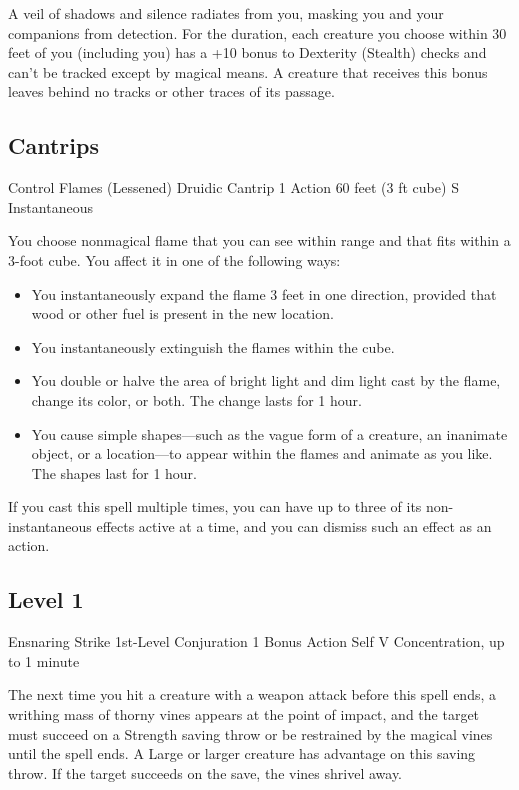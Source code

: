 \documentclass[letterpaper,openany,oneside,twocolumn]{book}
\begin{document}
A veil of shadows and silence radiates from you, masking you and your companions from detection. For the duration, each creature you choose within 30 feet of you (including you) has a +10 bonus to Dexterity (Stealth) checks and can't be tracked except by magical means. A creature that receives this bonus leaves behind no tracks or other traces of its passage.

\subsection*{Cantrips}

\DndSpellHeader
  {Control Flames (Lessened)}
  {Druidic Cantrip}
  {1 Action}
  {60 feet (3 ft cube)}
  {S}
  {Instantaneous}

You choose nonmagical flame that you can see within range and that fits within a 3-foot cube. You affect it in one of the following ways:
\begin{itemize}
	\item You instantaneously expand the flame 3 feet in one direction, provided that wood or other fuel is present in the new location.
	\item You instantaneously extinguish the flames within the cube.
	\item You double or halve the area of bright light and dim light cast by the flame, change its color, or both. The change lasts for 1 hour.
	\item You cause simple shapes—such as the vague form of a creature, an inanimate object, or a location—to appear within the flames and animate as you like. The shapes last for 1 hour.
\end{itemize}
If you cast this spell multiple times, you can have up to three of its non-instantaneous effects active at a time, and you can dismiss such an effect as an action.


\subsection*{Level 1}

\DndSpellHeader
  {Ensnaring Strike}
  {1st-Level Conjuration}
  {1 Bonus Action}
  {Self}
  {V}
  {Concentration, up to 1 minute}

The next time you hit a creature with a weapon attack before this spell ends, a writhing mass of thorny vines appears at the point of impact, and the target must succeed on a Strength saving throw or be restrained by the magical vines until the spell ends. A Large or larger creature has advantage on this saving throw. If the target succeeds on the save, the vines shrivel away.
\end{document}
